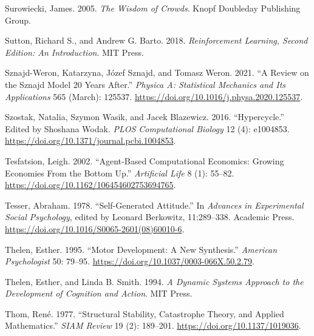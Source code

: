 \documentclass[
  a4paper,
  DIV=11,
  numbers=noendperiod,
  oneside]{scrreprt}
\newlength{\cslhangindent}
\newlength{\cslentryspacingunit} %
\newenvironment{CSLReferences}[2] %
 {%
  \setlength{\parindent}{0pt}
  \ifodd #1
  \let\oldpar\par
  \def\par{\hangindent=\cslhangindent\oldpar}
  \fi
  \setlength{\parskip}{#2\cslentryspacingunit}
 }%
 {}
\begin{document}
\begin{CSLReferences}{1}{0}
\leavevmode{}%
Surowiecki, James. 2005. \emph{The {Wisdom} of {Crowds}}. {Knopf
Doubleday Publishing Group}.

\leavevmode{}%
Sutton, Richard S., and Andrew G. Barto. 2018. \emph{Reinforcement
{Learning}, Second Edition: {An Introduction}}. {MIT Press}.

\leavevmode{}%
Sznajd-Weron, Katarzyna, Józef Sznajd, and Tomasz Weron. 2021. {``A
Review on the {Sznajd} Model \textemdash{} 20 Years After.''}
\emph{Physica A: Statistical Mechanics and Its Applications} 565
(March): 125537. \url{https://doi.org/10.1016/j.physa.2020.125537}.

\leavevmode{}%
Szostak, Natalia, Szymon Wasik, and Jacek Blazewicz. 2016.
{``Hypercycle.''} Edited by Shoshana Wodak. \emph{PLOS Computational
Biology} 12 (4): e1004853.
\url{https://doi.org/10.1371/journal.pcbi.1004853}.

\leavevmode{}%
Tesfatsion, Leigh. 2002. {``Agent-{Based Computational Economics}:
{Growing Economies From} the {Bottom Up}.''} \emph{Artificial Life} 8
(1): 55--82. \url{https://doi.org/10.1162/106454602753694765}.

\leavevmode{}%
Tesser, Abraham. 1978. {``Self-{Generated Attitude}.''} In
\emph{Advances in {Experimental Social Psychology}}, edited by Leonard
Berkowitz, 11:289--338. {Academic Press}.
\url{https://doi.org/10.1016/S0065-2601(08)60010-6}.

\leavevmode{}%
Thelen, Esther. 1995. {``Motor Development: {A} New Synthesis.''}
\emph{American Psychologist} 50: 79--95.
\url{https://doi.org/10.1037/0003-066X.50.2.79}.

\leavevmode{}%
Thelen, Esther, and Linda B. Smith. 1994. \emph{A {Dynamic Systems
Approach} to the {Development} of {Cognition} and {Action}}. {MIT
Press}.

\leavevmode{}%
Thom, René. 1977. {``Structural {Stability}, {Catastrophe Theory}, and
{Applied Mathematics}.''} \emph{SIAM Review} 19 (2): 189--201.
\url{https://doi.org/10.1137/1019036}.


\end{CSLReferences}
\end{document}
